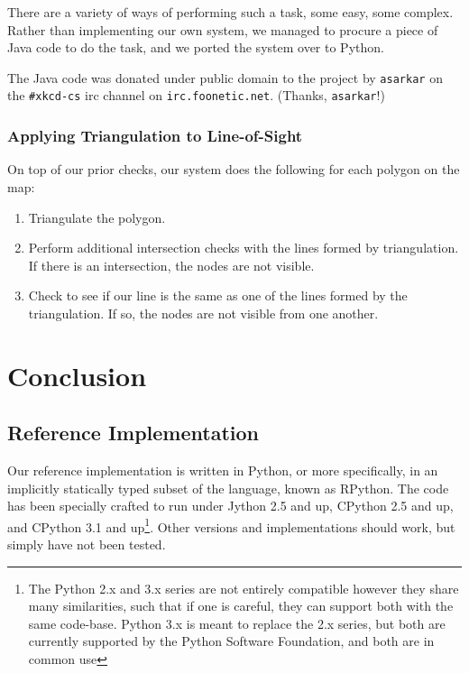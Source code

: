 \documentclass[letterpaper, 12pt]{article}
\begin{document}
\begin{multicols}{2}
There are a variety of ways of performing such a task, some easy, some complex.
Rather than implementing our own system, we managed to procure a piece of Java
code to do the task, and we ported the system over to Python.

The Java code was donated under public domain to the project by \texttt{asarkar}
on the \texttt{\#xkcd-cs} irc channel on \texttt{irc.foonetic.net}. (Thanks,
\texttt{asarkar}!)

\subsubsection{Applying Triangulation to Line-of-Sight}

On top of our prior checks, our system does the following for each polygon on
the map:

\begin{enumerate}
    \item Triangulate the polygon.
    \item Perform additional intersection checks with the lines formed by
          triangulation. If there is an intersection, the nodes are not visible.
    \item Check to see if our line is the same as one of the lines formed by the
          triangulation. If so, the nodes are not visible from one another.
\end{enumerate}

\section{Conclusion}

\subsection{Reference Implementation}

Our reference implementation is written in Python, or more specifically, in an
implicitly statically typed subset of the language, known as RPython. The code
has been specially crafted to run under Jython 2.5 and up, CPython 2.5 and up,
and CPython 3.1 and up\footnote{The Python 2.x and 3.x series are not entirely
compatible however they share many similarities, such that if one is careful,
they can support both with the same code-base. Python 3.x is meant to replace
the 2.x series, but both are currently supported by the Python Software
Foundation, and both are in common use}. Other versions and implementations
should work, but simply have not been tested.


\end{multicols}
\end{document}
